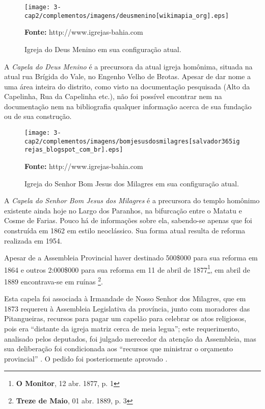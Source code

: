 \begin{figure}[!htp]
\centering
\texttt{[image: 3-cap2/complementos/imagens/deusmenino[wikimapia\_org].eps]}{\footnotesize \par \textbf{Fonte:} http://www.igrejas-bahia.com \par}
\caption{Igreja do Deus Menino em sua configuração atual.}
\end{figure}

A \textit{Capela do Deus Menino} é a precursora da atual igreja homônima, situada na atual rua Brígida do Vale, no Engenho Velho de Brotas. Apesar de dar nome a uma área inteira do distrito, como visto na documentação pesquisada (Alto da Capelinha, Rua da Capelinha etc.), não foi possível encontrar nem na documentação nem na bibliografia qualquer informação acerca de sua fundação ou de sua construção.  

\begin{figure}[!htp]
\centering
\texttt{[image: 3-cap2/complementos/imagens/bomjesusdosmilagres[salvador365igrejas\_blogspot\_com\_br].eps]}{\footnotesize \par \textbf{Fonte:} http://www.igrejas-bahia.com \par}
\caption{Igreja do Senhor Bom Jesus dos Milagres em sua configuração atual.}
\end{figure}

A \textit{Capela do Senhor Bom Jesus dos Milagres} é a precursora do templo homônimo existente ainda hoje no Largo dos Paranhos, na bifurcação entre o Matatu e Cosme de Farias. Pouco há de informações sobre ela, sabendo-se apenas que foi construída em 1862 \cite[p.~251]{VASCONCELOS2002} em estilo neoclássico. Sua forma atual resulta de reforma realizada em 1954.

Apesar de a Assembleia Provincial haver destinado 500\$000 para sua reforma em 1864 \cite[anexo~2, p.~2]{silvagomes_relatorio_1864} e outros 2:000\$000 para sua reforma em 11 de abril de 1877\footnote{\textbf{O Monitor}, 12 abr. 1877, p. 1}, em abril de 1889 encontrava-se em ruínas \footnote{\textbf{Treze de Maio}, 01 abr. 1889, p. 3}. 

Esta capela foi associada à Irmandade de Nosso Senhor dos Milagres, que em 1873 requereu à Assembleia Legislativa da província, junto com moradores das Pitangueiras, recursos para pagar um capelão para celebrar os atos religiosos, pois era ``distante da igreja matriz cerca de meia legua''; este requerimento, analisado pelos deputados, foi julgado merecedor da atenção da Assembleia, mas sua deliberação foi condicionada aos ``recursos que ministrar o orçamento provincial'' \cite[p.~46]{bahia_relatassleg_1873}. O pedido foi posteriormente aprovado \cite[p.~53]{bahia_relatassleg_1873}.

